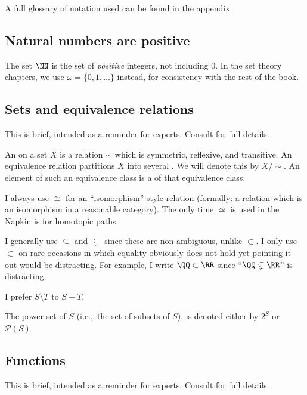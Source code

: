 A full glossary of notation used can be found in the appendix.

\subsection{Natural numbers are positive}
The set $\NN$ is the set of \emph{positive} integers, not including $0$.
In the set theory chapters, we use $\omega = \{0, 1, \dots\}$
instead, for consistency with the rest of the book.

\subsection{Sets and equivalence relations}
This is brief, intended as a reminder for experts.
Consult  for full details.

An  on a set $X$ is a relation $\sim$
which is symmetric, reflexive, and transitive.
An equivalence relation partitions $X$
into several .
We will denote this by $X / {\sim}$.
An element of such an equivalence class is a
 of that equivalence class.

I always use $\cong$ for an ``isomorphism''-style relation
(formally: a relation which is an isomorphism in a reasonable category).
The only time $\simeq$ is used in the Napkin is for homotopic paths.

I generally use $\subseteq$ and $\subsetneq$ since these are non-ambiguous,
unlike $\subset$.  I only use $\subset$ on rare occasions in which equality
obviously does not hold yet pointing it out would be distracting.
For example, I write $\QQ \subset \RR$
since ``$\QQ \subsetneq \RR$'' is distracting.

I prefer $S \setminus T$ to $S - T$.

The power set of $S$ (i.e.,\ the set of subsets of $S$),
is denoted either by $2^S$ or $\mathcal P(S)$.

\subsection{Functions}
This is brief, intended as a reminder for experts.
Consult  for full details.

